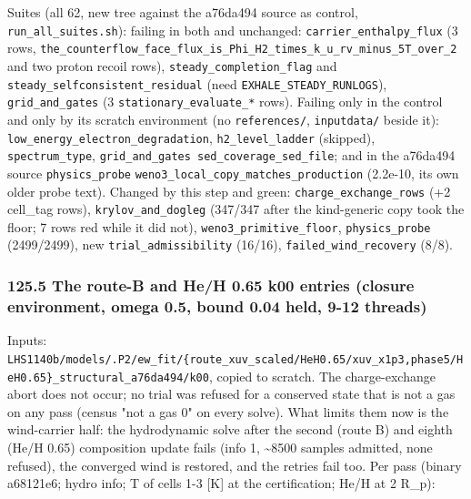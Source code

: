 \documentclass[english,a4paper]{my_memo}
\begin{document}
Suites (all 62, new tree against the a76da494 source as control, \texttt{run\_all\_suites.sh}): failing in both and unchanged: \texttt{carrier\_enthalpy\_flux} (3 rows, \texttt{the\_counterflow\_face\_flux\_is\_Phi\_H2\_times\_k\_u\_rv\_minus\_5T\_over\_2} and two proton recoil rows), \texttt{steady\_completion\_flag} and \texttt{steady\_selfconsistent\_residual} (need \texttt{EXHALE\_STEADY\_RUNLOGS}), \texttt{grid\_and\_gates} (3 \texttt{stationary\_evaluate\_*} rows). Failing only in the control and only by its scratch environment (no \texttt{references/}, \texttt{inputdata/} beside it): \texttt{low\_energy\_electron\_degradation}, \texttt{h2\_level\_ladder} (skipped), \texttt{spectrum\_type}, \texttt{grid\_and\_gates\ sed\_coverage\_sed\_file}; and in the a76da494 source \texttt{physics\_probe} \texttt{weno3\_local\_copy\_matches\_production} (2.2e-10, its own older probe text). Changed by this step and green: \texttt{charge\_exchange\_rows} (+2 cell\_tag rows), \texttt{krylov\_and\_dogleg} (347/347 after the kind-generic copy took the floor; 7 rows red while it did not), \texttt{weno3\_primitive\_floor}, \texttt{physics\_probe} (2499/2499), new \texttt{trial\_admissibility} (16/16), \texttt{failed\_wind\_recovery} (8/8).

\subsubsection{125.5 The route-B and He/H 0.65 k00 entries (closure environment, omega 0.5, bound 0.04 held, 9-12 threads)}\label{1255-the-route-b-and-heh-065-k00-entries-closure-environment-omega-05-bound-004-held-9-12-threads}

Inputs: \texttt{LHS1140b/models/.P2/ew\_fit/\{route\_xuv\_scaled/HeH0.65/xuv\_x1p3,phase5/HeH0.65\}\_structural\_a76da494/k00}, copied to scratch. The charge-exchange abort does not occur; no trial was refused for a conserved state that is not a gas on any pass (census "not a gas 0" on every solve). What limits them now is the wind-carrier half: the hydrodynamic solve after the second (route B) and eighth (He/H 0.65) composition update fails (info 1, \textasciitilde8500 samples admitted, none refused), the converged wind is restored, and the retries fail too. Per pass (binary a68121e6; hydro info; T of cells 1-3 {[}K{]} at the certification; He/H at 2 R\_p):
\end{document}
